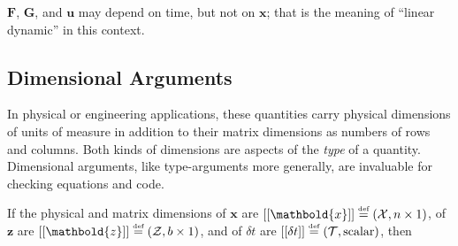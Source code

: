 \documentclass[10pt,oneside,x11names]{article}
\begin{document}
\noindent  \(\mathbold{F}\), \(\mathbold{G}\), and \(\mathbold{u}\) may depend
on time, but not on \(\mathbold{x}\); that is the meaning of ``linear dynamic'' in
this context. 

\subsection{Dimensional Arguments}
\label{sec:orgheadline3}

In physical or engineering applications, these quantities carry physical
dimensions of units of measure in addition to their matrix dimensions as numbers
of rows and columns. Both kinds of dimensions are aspects of the \emph{type} of a
quantity. Dimensional arguments, like type-arguments more generally, are
invaluable for checking equations and code.

If the physical and matrix dimensions of 
\(\mathbold{x}\) 
are
\(\left[\left[\mathbold{x}\right]\right]
\stackrel{\text{\tiny def}}{=}
(\mathcal{X}, n\times{1})\),
of 
\(\mathbold{z}\) 
are
\(\left[\left[\mathbold{z}\right]\right]
\stackrel{\text{\tiny def}}{=}
(\mathcal{Z}, b\times{1})\), 
and of 
\(\delta{t}\)
are
\(\left[\left[\delta{t}\right]\right]
\stackrel{\text{\tiny def}}{=}
(\mathcal{T}, \textrm{scalar})\), 
then
\end{document}
